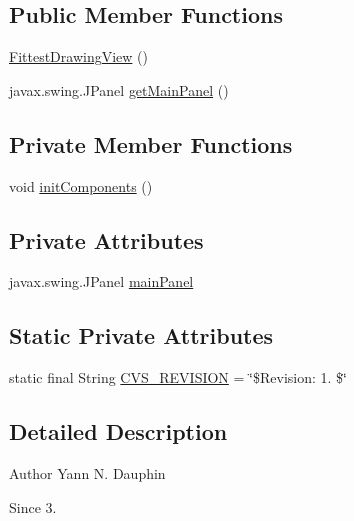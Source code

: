 \subsection*{Public Member Functions}
\begin{DoxyCompactItemize}
\item 
\hyperlink{classexamples_1_1gp_1_1monalisa_1_1gui_1_1_fittest_drawing_view_acc34d7fed1890517d16c8700cd1c523d}{Fittest\-Drawing\-View} ()
\item 
javax.\-swing.\-J\-Panel \hyperlink{classexamples_1_1gp_1_1monalisa_1_1gui_1_1_fittest_drawing_view_a7ef61fd990543ab0a7d5fffa4896cbfa}{get\-Main\-Panel} ()
\end{DoxyCompactItemize}
\subsection*{Private Member Functions}
\begin{DoxyCompactItemize}
\item 
void \hyperlink{classexamples_1_1gp_1_1monalisa_1_1gui_1_1_fittest_drawing_view_a062648dd16015429fc52eecac2e91637}{init\-Components} ()
\end{DoxyCompactItemize}
\subsection*{Private Attributes}
\begin{DoxyCompactItemize}
\item 
javax.\-swing.\-J\-Panel \hyperlink{classexamples_1_1gp_1_1monalisa_1_1gui_1_1_fittest_drawing_view_a466838532b223edc69311e8193788c7a}{main\-Panel}
\end{DoxyCompactItemize}
\subsection*{Static Private Attributes}
\begin{DoxyCompactItemize}
\item 
static final String \hyperlink{classexamples_1_1gp_1_1monalisa_1_1gui_1_1_fittest_drawing_view_ae6055da6aad5d8de8cb42272378f9f05}{C\-V\-S\-\_\-\-R\-E\-V\-I\-S\-I\-O\-N} = \char`\"{}\$Revision\-: 1. \$\char`\"{}
\end{DoxyCompactItemize}


\subsection{Detailed Description}
\begin{DoxyAuthor}{Author}
Yann N. Dauphin 
\end{DoxyAuthor}
\begin{DoxySince}{Since}
3. 
\end{DoxySince}


